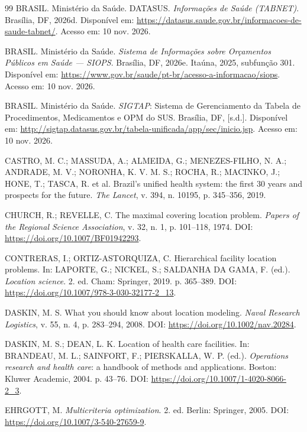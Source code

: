 \documentclass[12pt,a4paper,oneside]{report}
\begin{document}
\begin{thebibliography}{99}
BRASIL. Ministério da Saúde. DATASUS. \textit{Informações de Saúde (TABNET)}. Brasília, DF, 2026d. Disponível em: \url{https://datasus.saude.gov.br/informacoes-de-saude-tabnet/}. Acesso em: 10 nov. 2026.

BRASIL. Ministério da Saúde. \textit{Sistema de Informações sobre Orçamentos Públicos em Saúde --- SIOPS}. Brasília, DF, 2026e. Itaúna, 2025, subfunção 301. Disponível em: \url{https://www.gov.br/saude/pt-br/acesso-a-informacao/siops}. Acesso em: 10 nov. 2026.

BRASIL. Ministério da Saúde. \textit{SIGTAP}: Sistema de Gerenciamento da Tabela de Procedimentos, Medicamentos e OPM do SUS. Brasília, DF, [s.d.]. Disponível em: \url{http://sigtap.datasus.gov.br/tabela-unificada/app/sec/inicio.jsp}. Acesso em: 10 nov. 2026.

CASTRO, M. C.; MASSUDA, A.; ALMEIDA, G.; MENEZES-FILHO, N. A.; ANDRADE, M. V.; NORONHA, K. V. M. S.; ROCHA, R.; MACINKO, J.; HONE, T.; TASCA, R. et al. Brazil's unified health system: the first 30 years and prospects for the future. \textit{The Lancet}, v. 394, n. 10195, p. 345--356, 2019.

CHURCH, R.; REVELLE, C. The maximal covering location problem. \textit{Papers of the Regional Science Association}, v. 32, n. 1, p. 101--118, 1974. DOI: \url{https://doi.org/10.1007/BF01942293}.

CONTRERAS, I.; ORTIZ-ASTORQUIZA, C. Hierarchical facility location problems. In: LAPORTE, G.; NICKEL, S.; SALDANHA DA GAMA, F. (ed.). \textit{Location science}. 2. ed. Cham: Springer, 2019. p. 365--389. DOI: \url{https://doi.org/10.1007/978-3-030-32177-2_13}.

DASKIN, M. S. What you should know about location modeling. \textit{Naval Research Logistics}, v. 55, n. 4, p. 283--294, 2008. DOI: \url{https://doi.org/10.1002/nav.20284}.

DASKIN, M. S.; DEAN, L. K. Location of health care facilities. In: BRANDEAU, M. L.; SAINFORT, F.; PIERSKALLA, W. P. (ed.). \textit{Operations research and health care}: a handbook of methods and applications. Boston: Kluwer Academic, 2004. p. 43--76. DOI: \url{https://doi.org/10.1007/1-4020-8066-2_3}.

EHRGOTT, M. \textit{Multicriteria optimization}. 2. ed. Berlin: Springer, 2005. DOI: \url{https://doi.org/10.1007/3-540-27659-9}.


\end{thebibliography}
\end{document}
